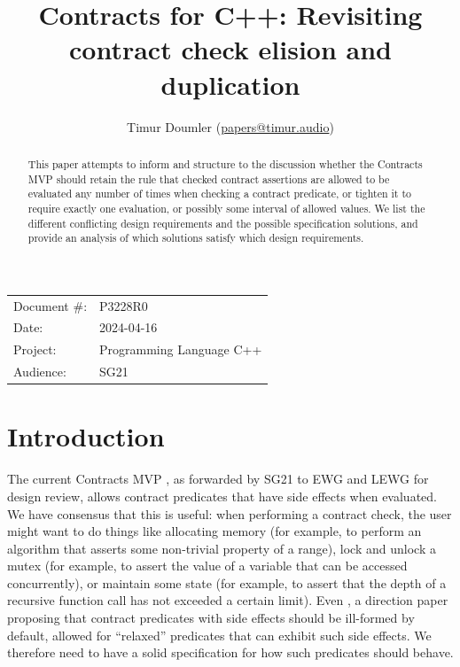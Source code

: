 

 \usepackage[bottom]{footmisc} 

 \usepackage{longtable}



\title{Contracts for C++: Revisiting contract check elision and duplication}
\author{ Timur Doumler \small(\href{mailto:papers@timur.audio}{papers@timur.audio}) 
}
\date{}
\maketitle

\begin{tabular}{ll}
Document \#: & P3228R0 \\
Date: &2024-04-16 \\
Project: & Programming Language C++ \\
Audience: & SG21
\end{tabular}

\begin{abstract}
This paper attempts to inform and structure to the discussion whether the Contracts MVP should retain the rule that checked contract assertions are allowed to be evaluated any number of times when checking a contract predicate, or tighten it to require exactly one evaluation, or possibly some interval of allowed values. We list the different conflicting design requirements and the possible specification solutions, and provide an analysis of which solutions satisfy which design requirements.
\end{abstract}


\section{Introduction}
\label{sec:intro}

The current Contracts MVP \cite{P2900R6}, as forwarded by SG21 to EWG and LEWG for design review, allows contract predicates that have side effects when evaluated. We have consensus that this is useful: when performing a contract check, the user might want to do things like allocating memory (for example, to perform an algorithm that asserts some non-trivial property of a range), lock and unlock a mutex (for example, to assert the value of a variable that can be accessed concurrently), or maintain some state (for example, to assert that the depth of a recursive function call has not exceeded a certain limit). Even \cite{P2680R1}, a direction paper proposing that contract predicates with side effects should be ill-formed by default, allowed for ``relaxed'' predicates that can exhibit such side effects. We therefore need to have a solid specification for how such predicates should behave.

